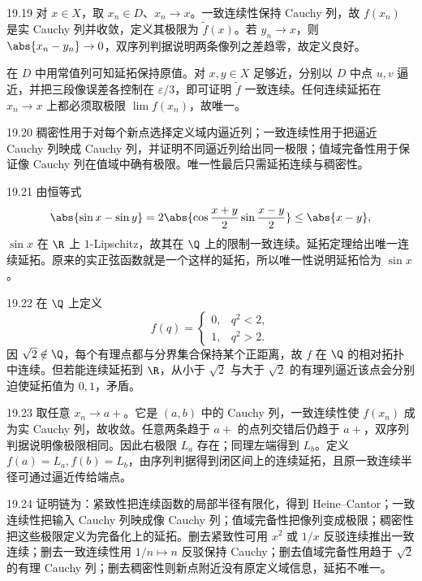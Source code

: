 \begin{solution}{19.19}
对 \(x\in X\)，取 \(x_n\in D\)、\(x_n\to x\)。一致连续性保持 Cauchy 列，故 \(f(x_n)\) 是实 Cauchy 列并收敛，定义其极限为 \(\widetilde f(x)\)。若 \(y_n\to x\)，则 \(\abs{x_n-y_n}\to0\)，双序列判据说明两条像列之差趋零，故定义良好。

在 \(D\) 中用常值列可知延拓保持原值。对 \(x,y\in X\) 足够近，分别以 \(D\) 中点 \(u,v\) 逼近，并把三段像误差各控制在 \(\varepsilon/3\)，即可证明 \(\widetilde f\) 一致连续。任何连续延拓在 \(x_n\to x\) 上都必须取极限 \(\lim f(x_n)\)，故唯一。
\end{solution}

\begin{solution}{19.20}
稠密性用于对每个新点选择定义域内逼近列；一致连续性用于把逼近 Cauchy 列映成 Cauchy 列，并证明不同逼近列给出同一极限；值域完备性用于保证像 Cauchy 列在值域中确有极限。唯一性最后只需延拓连续与稠密性。
\end{solution}

\begin{solution}{19.21}
由恒等式
\[
 \abs{\sin x-\sin y}
 =2\abs{\cos\frac{x+y}{2}\sin\frac{x-y}{2}}
 \le\abs{x-y},
\]
\(\sin x\) 在 \(\R\) 上 \(1\)-Lipschitz，故其在 \(\Q\) 上的限制一致连续。延拓定理给出唯一连续延拓。原来的实正弦函数就是一个这样的延拓，所以唯一性说明延拓恰为 \(\sin x\)。
\end{solution}

\begin{solution}{19.22}
在 \(\Q\) 上定义
\[
 f(q)=
 \begin{cases}
 0,&q^2<2,\\
 1,&q^2>2.
 \end{cases}
\]
因 \(\sqrt2\notin\Q\)，每个有理点都与分界集合保持某个正距离，故 \(f\) 在 \(\Q\) 的相对拓扑中连续。但若能连续延拓到 \(\R\)，从小于 \(\sqrt2\) 与大于 \(\sqrt2\) 的有理列逼近该点会分别迫使延拓值为 \(0,1\)，矛盾。
\end{solution}

\begin{solution}{19.23}
取任意 \(x_n\to a+\)。它是 \((a,b)\) 中的 Cauchy 列，一致连续性使 \(f(x_n)\) 成为实 Cauchy 列，故收敛。任意两条趋于 \(a+\) 的点列交错后仍趋于 \(a+\)，双序列判据说明像极限相同。因此右极限 \(L_a\) 存在；同理左端得到 \(L_b\)。定义 \(f(a)=L_a,f(b)=L_b\)，由序列判据得到闭区间上的连续延拓，且原一致连续半径可通过逼近传给端点。
\end{solution}

\begin{solution}{19.24}
证明链为：紧致性把连续函数的局部半径有限化，得到 Heine--Cantor；一致连续性把输入 Cauchy 列映成像 Cauchy 列；值域完备性把像列变成极限；稠密性把这些极限定义为完备化上的延拓。删去紧致性可用 \(x^2\) 或 \(1/x\) 反驳连续推出一致连续；删去一致连续性用 \(1/n\mapsto n\) 反驳保持 Cauchy；删去值域完备性用趋于 \(\sqrt2\) 的有理 Cauchy 列；删去稠密性则新点附近没有原定义域信息，延拓不唯一。
\end{solution}

